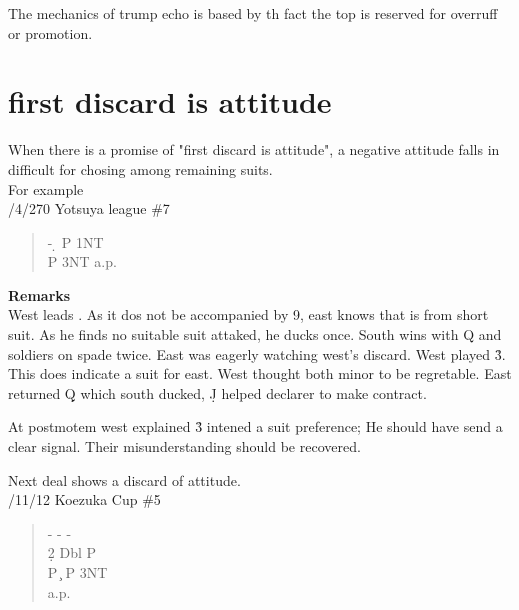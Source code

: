 The mechanics of trump echo is based by th fact the top is reserved for
overruff or promotion.



\section{first discard is attitude}

When there is a promise of "first discard is attitude", a negative
attitude falls in difficult for chosing among remaining suits.\\
For example\\
/4/270 Yotsuya league \#7
\begin{quote}
%
  {}%
  {}
  {}%
  {}%
\end{quote}
\begin{quote}
\begin{bidding}
- \d  \> P \> 1NT \\
P \> 3NT \> a.p.
\end{bidding}
\end{quote}
{\bf Remarks}\\

West leads . As it dos not be accompanied by 9, east
knows that is from short suit. As he finds no suitable suit attaked,
he ducks once. South wins with \s Q and soldiers on spade twice.
East was eagerly watching west's discard. West played \h 3.
This does indicate a suit for east. West thought both minor to
be regretable. East returned \d Q which south ducked, \d J helped
declarer to make contract.

At postmotem west explained \h 3 intened a suit preference;
He should have send a clear signal. Their misunderstanding
should be recovered.

\vspace{0.5cm}

Next deal shows a discard of attitude.\\

/11/12 Koezuka Cup \#5
\begin{quote}
%
  {}%
  {}
  {}%
  {}%
\end{quote}
\begin{quote}
\begin{bidding}
- \> -  \> - \c \\
2\d  \> Dbl \> P \s \\
P \c \> P \> 3NT \\
a.p.
\end{bidding}
\end{quote}

